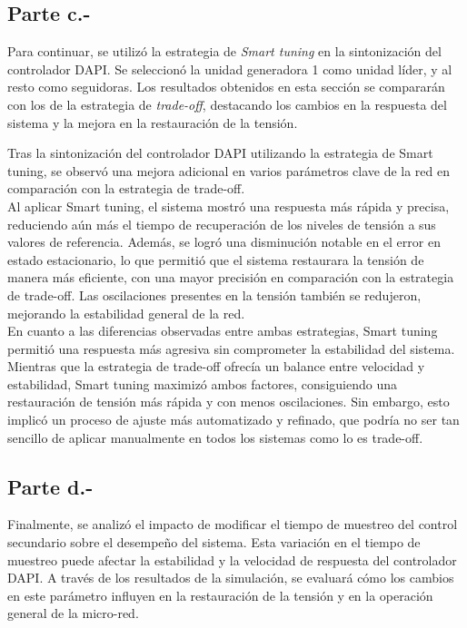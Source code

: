 \subsection{Parte c.-}

Para continuar, se utilizó la estrategia de \textit{Smart tuning} en la sintonización del controlador DAPI. Se seleccionó la unidad generadora 1 como unidad líder, y al resto como seguidoras. Los resultados obtenidos en esta sección se compararán con los de la estrategia de \textit{trade-off}, destacando los cambios en la respuesta del sistema y la mejora en la restauración de la tensión.


Tras la sintonización del controlador DAPI utilizando la estrategia de Smart tuning, se observó una mejora adicional en varios parámetros clave de la red en comparación con la estrategia de trade-off.\\

Al aplicar Smart tuning, el sistema mostró una respuesta más rápida y precisa, reduciendo aún más el tiempo de recuperación de los niveles de tensión a sus valores de referencia. Además, se logró una disminución notable en el error en estado estacionario, lo que permitió que el sistema restaurara la tensión de manera más eficiente, con una mayor precisión en comparación con la estrategia de trade-off. Las oscilaciones presentes en la tensión también se redujeron, mejorando la estabilidad general de la red.\\

En cuanto a las diferencias observadas entre ambas estrategias, Smart tuning permitió una respuesta más agresiva sin comprometer la estabilidad del sistema. Mientras que la estrategia de trade-off ofrecía un balance entre velocidad y estabilidad, Smart tuning maximizó ambos factores, consiguiendo una restauración de tensión más rápida y con menos oscilaciones. Sin embargo, esto implicó un proceso de ajuste más automatizado y refinado, que podría no ser tan sencillo de aplicar manualmente en todos los sistemas como lo es trade-off.

\subsection{Parte d.-}

Finalmente, se analizó el impacto de modificar el tiempo de muestreo del control secundario sobre el desempeño del sistema. Esta variación en el tiempo de muestreo puede afectar la estabilidad y la velocidad de respuesta del controlador DAPI. A través de los resultados de la simulación, se evaluará cómo los cambios en este parámetro influyen en la restauración de la tensión y en la operación general de la micro-red.

